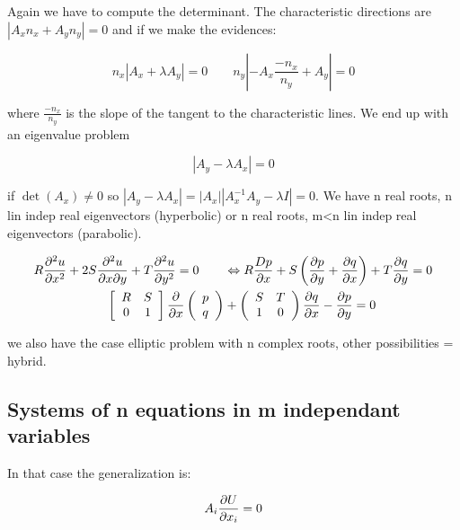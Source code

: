 Again we have to compute the determinant. The characteristic directions are $|A_x n_x + A_y n_y| = 0$ and if we make the evidences: 

\begin{equation}
n_x |A_x + \lambda A_y| = 0 \qquad n_y \left|-A_x \frac{-n_x}{n_y} + A_y\right| = 0
\end{equation} 

where $\frac{-n_x}{n_y}$ is the slope of the tangent to the characteristic lines. We end up with an eigenvalue problem

\begin{equation}
|A_y - \lambda A_x| = 0
\end{equation}

if $\det (A_x) \neq 0$ so $|A_y - \lambda A_x| = |A_x||A_x^{-1}A_y - \lambda I| = 0$. We have n real roots, n lin indep real eigenvectors (hyperbolic) or n real roots, m<n lin indep real eigenvectors (parabolic). 

\begin{equation}
\begin{aligned}
R\frac{\partial ^2 u}{\partial x^2} + 2S \frac{\partial ^2 u}{\partial x \partial y} + T\frac{\partial ^2 u}{\partial y^2} = 0 \qquad &\Leftrightarrow R\frac{D p}{\partial x}  + S \left(  \frac{\partial p }{\partial y	} + \frac{\partial q}{\partial x}\right) + T\frac{\partial q}{\partial y} = 0\\
\left[
\begin{array}{cc}
R & S\\
0 & 1
\end{array}
\right]
\frac{\partial }{\partial x}\left( 
\begin{array}{c}
p\\
q
\end{array}
\right)
&+ \left( 
\begin{array}{cc}
S & T\\
1 & 0
\end{array}
\right)\frac{\partial q}{\partial x} - \frac{\partial p }{\partial y} = 0
\end{aligned}
\end{equation}

we also have the case elliptic problem with n complex roots, other possibilities = hybrid. \\

\subsection{Systems of n equations in m independant variables}
In that case the generalization is: 

\begin{equation}
A_i \frac{\partial U}{\partial x_i} = 0
\end{equation}

